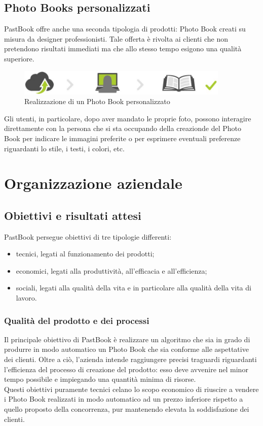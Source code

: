 		\subsection{Photo Books personalizzati}
			PastBook offre anche una seconda tipologia di prodotti: Photo Book creati su misura da designer professionisti. Tale offerta
			è rivolta ai clienti che non pretendono risultati immediati ma che allo stesso tempo esigono una qualità superiore.
			\begin{figure}[H]
				\centering
				\includegraphics[width=0.9\textwidth]{capitolo_1/immagini/photo_book_personalizzato.png}
				\caption[Realizzazione di un Photo Book personalizzato]{Realizzazione di un Photo Book personalizzato\protect\footnotemark}
			\end{figure}
			\noindent Gli utenti, in particolare, dopo aver mandato le proprie foto, possono interagire direttamente con la persona che
			si sta occupando della creazionde del Photo Book per indicare le immagini preferite o per esprimere eventuali preferenze
			riguardanti lo stile, i testi, i colori, etc.
	\section{Organizzazione aziendale}
		\subsection{Obiettivi e risultati attesi}
			PastBook persegue obiettivi di tre tipologie differenti:
			\begin{itemize}
				\item tecnici, legati al funzionamento dei prodotti;
				\item economici, legati alla produttività, all'efficacia e all'efficienza;
				\item sociali, legati alla qualità della vita e in particolare alla qualità della vita di lavoro.
			\end{itemize}
			\subsubsection{Qualità del prodotto e dei processi}
				Il principale obiettivo di PastBook è realizzare un algoritmo che sia in grado di produrre in modo
				automatico un Photo Book che sia conforme alle aspettative dei clienti. Oltre a ciò, l'azienda intende raggiungere
				precisi traguardi riguardanti l'efficienza del processo di creazione del prodotto: esso deve avvenire nel minor tempo
				possibile e impiegando una quantità minima di risorse.\\
				Questi obiettivi puramente tecnici celano lo scopo economico di riuscire a vendere i Photo Book realizzati in modo
				automatico ad un prezzo inferiore rispetto a quello proposto della concorrenza, pur mantenendo elevata la
				soddisfazione dei clienti.
